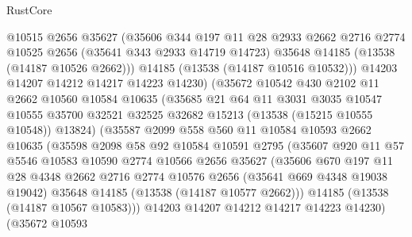 \begin{lexlean}{RustCore}
\begin{coremodule}
                @10515
                @2656
                @35627
                (@35606
                  @344
                  @197
                  @11
                  @28
                  @2933
                  @2662
                  @2716
                  @2774
                  @10525
                  @2656
                  (@35641 @343 @2933 @14719 @14723)
                  @35648
                  @14185
                  (@13538 (@14187 @10526 @2662)))
                @14185
                (@13538 (@14187 @10516 @10532)))
              @14203
              @14207
              @14212
              @14217
              @14223
              @14230)
            (@35672
              @10542
              @430
              @2102
              @11
              @2662
              @10560
              @10584
              @10635
              (@35685
                @21
                @64
                @11
                @3031
                @3035
                @10547
                @10555
                @35700
                @32521
                @32525
                @32682
                @15213
                (@13538 (@15215 @10555 @10548))
                @13824)
              (@35587
                @2099
                @558
                @560
                @11
                @10584
                @10593
                @2662
                @10635
                (@35598
                  @2098
                  @58
                  @92
                  @10584
                  @10591
                  @2795
                  (@35607
                    @920
                    @11
                    @57
                    @5546
                    @10583
                    @10590
                    @2774
                    @10566
                    @2656
                    @35627
                    (@35606
                      @670
                      @197
                      @11
                      @28
                      @4348
                      @2662
                      @2716
                      @2774
                      @10576
                      @2656
                      (@35641 @669 @4348 @19038 @19042)
                      @35648
                      @14185
                      (@13538 (@14187 @10577 @2662)))
                    @14185
                    (@13538 (@14187 @10567 @10583)))
                  @14203
                  @14207
                  @14212
                  @14217
                  @14223
                  @14230)
                (@35672
                  @10593

\end{coremodule}
\end{lexlean}
